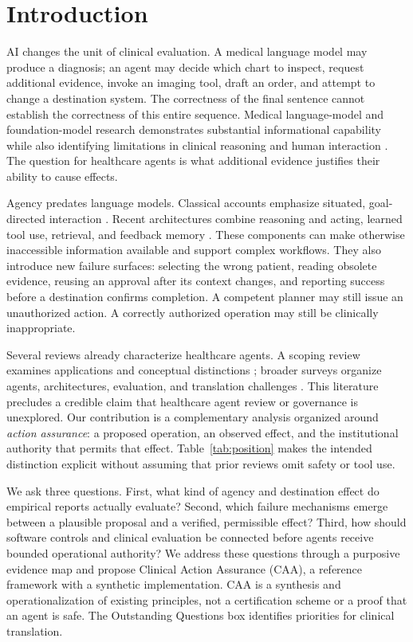 \section{Introduction}
 AI changes the unit of clinical evaluation. A medical language model may produce a diagnosis; an agent may decide which chart to inspect, request additional evidence, invoke an imaging tool, draft an order, and attempt to change a destination system. The correctness of the final sentence cannot establish the correctness of this entire sequence. Medical language-model and foundation-model research demonstrates substantial informational capability while also identifying limitations in clinical reasoning and human interaction \cite{singhal2023,moor2023,hager2024,goh2024}. The question for healthcare agents is what additional evidence justifies their ability to cause effects.

Agency predates language models. Classical accounts emphasize situated, goal-directed interaction \cite{wooldridge1995}. Recent architectures combine reasoning and acting, learned tool use, retrieval, and feedback memory \cite{react2023,toolformer2023,rag2020,reflexion2023}. These components can make otherwise inaccessible information available and support complex workflows. They also introduce new failure surfaces: selecting the wrong patient, reading obsolete evidence, reusing an approval after its context changes, and reporting success before a destination confirms completion. A competent planner may still issue an unauthorized action. A correctly authorized operation may still be clinically inappropriate.

Several reviews already characterize healthcare agents. A scoping review examines applications and conceptual distinctions \cite{collaco2026review}; broader surveys organize agents, architectures, evaluation, and translation challenges \cite{xu2026survey,vatsal2026taxonomy,hu2026survey}. This literature precludes a credible claim that healthcare agent review or governance is unexplored. Our contribution is a complementary analysis organized around \emph{action assurance}: a proposed operation, an observed effect, and the institutional authority that permits that effect. Table~\ref{tab:position} makes the intended distinction explicit without assuming that prior reviews omit safety or tool use.

We ask three questions. First, what kind of agency and destination effect do empirical reports actually evaluate? Second, which failure mechanisms emerge between a plausible proposal and a verified, permissible effect? Third, how should software controls and clinical evaluation be connected before agents receive bounded operational authority? We address these questions through a purposive evidence map and propose Clinical Action Assurance (CAA), a reference framework with a synthetic implementation. CAA is a synthesis and operationalization of existing principles, not a certification scheme or a proof that an agent is safe. The Outstanding Questions box identifies priorities for clinical translation.

